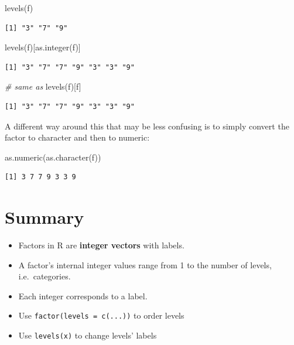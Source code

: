 \documentclass[
]{book}
\makeatletter
\newenvironment{Shaded}{\begin{snugshade}}{\end{snugshade}}
\newcommand{\CommentTok}[1]{\textcolor[rgb]{0.56,0.35,0.01}{\textit{#1}}}
\newcommand{\FunctionTok}[1]{\textcolor[rgb]{0.00,0.00,0.00}{#1}}
\newcommand{\NormalTok}[1]{#1}
\newenvironment{kframe}{%
\medskip{}
\setlength{\fboxsep}{.8em}
 \def\at@end@of@kframe{}%
 \ifinner\ifhmode%
  \def\at@end@of@kframe{\end{minipage}}%
  \begin{minipage}{\columnwidth}%
 \fi\fi%
 \def\FrameCommand##1{\hskip\@totalleftmargin \hskip-\fboxsep
 \colorbox{shadecolor}{##1}\hskip-\fboxsep
     \hskip-\linewidth \hskip-\@totalleftmargin \hskip\columnwidth}%
 \MakeFramed {\advance\hsize-\width
   \@totalleftmargin\z@ \linewidth\hsize
   \@setminipage}}%
 {\par\unskip\endMakeFramed%
 \at@end@of@kframe}
\newenvironment{rmdblock}[1]
  {
  \begin{itemize}
  \renewcommand{\labelitemi}{
    \raisebox{-.7\height}[0pt][0pt]{
      {\setkeys{Gin}{width=3em,keepaspectratio}\texttt{[image: images/\#1]}}
    }
  }
  \setlength{\fboxsep}{1em}
  \begin{kframe}
  \item
  }
  {
  \end{kframe}
  \end{itemize}
  }
\newenvironment{note}
  {\begin{rmdblock}{note}}
  {\end{rmdblock}}
\makeatother
\begin{document}
\begin{Shaded}
\begin{Highlighting}[]
\FunctionTok{levels}\NormalTok{(f)}
\end{Highlighting}
\end{Shaded}

\begin{verbatim}
[1] "3" "7" "9"
\end{verbatim}

\begin{Shaded}
\begin{Highlighting}[]
\FunctionTok{levels}\NormalTok{(f)[}\FunctionTok{as.integer}\NormalTok{(f)]}
\end{Highlighting}
\end{Shaded}

\begin{verbatim}
[1] "3" "7" "7" "9" "3" "3" "9"
\end{verbatim}

\begin{Shaded}
\begin{Highlighting}[]
\CommentTok{\# same as}
\FunctionTok{levels}\NormalTok{(f)[f]}
\end{Highlighting}
\end{Shaded}

\begin{verbatim}
[1] "3" "7" "7" "9" "3" "3" "9"
\end{verbatim}

A different way around this that may be less confusing is to simply convert the factor to character and then to numeric:

\begin{Shaded}
\begin{Highlighting}[]
\FunctionTok{as.numeric}\NormalTok{(}\FunctionTok{as.character}\NormalTok{(f))}
\end{Highlighting}
\end{Shaded}

\begin{verbatim}
[1] 3 7 7 9 3 3 9
\end{verbatim}

\hypertarget{summary}{%
\section{Summary}\label{summary}}

\begin{note}
\begin{itemize}
\item
  Factors in R are \textbf{integer vectors} with labels.
\item
  A factor's internal integer values range from 1 to the number of
  levels, i.e.~categories.
\item
  Each integer corresponds to a label.
\item
  Use \texttt{factor(levels\ =\ c(...))} to order levels
\item
  Use \texttt{levels(x)} to change levels' labels
\end{itemize}
\end{note}
\end{document}
